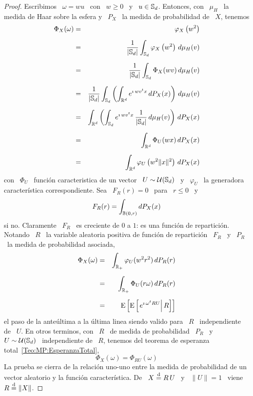 \begin{proof}
  Escribimos \  $\omega = w u$ \  con \ $w \ge  0$ \ y \  $u \in \mathbb{S}_d$.
  Entonces, con  \ $\mu_H$ \ la  medida de Haar sobre  la esfera y \  $P_X$ \ la
  medida de probabilidad de \ $X$, tenemos
  \begin{eqnarray*}
  \Phi_X(\omega) & = & \varphi_X\left( w^2 \right)\\[2mm]
  & = & \frac{1}{|\mathbb{S}_d|} \int_{\mathbb{S}_d} \varphi_X\left( w^2 \right) \, d\mu_H(v)\\[2mm]
  & = & \frac{1}{|\mathbb{S}_d|} \int_{\mathbb{S}_d} \Phi_X(w v) \, d\mu_H(v)\\[2mm]
  & = & \frac{1}{|\mathbb{S}_d|} \int_{\mathbb{S}_d} \left( \int_{\mathbb{R}^d} e^{\imath \,
  w v^t x} \, dP_X(x) \right) \, d\mu_H(v)\\[2mm]
  & = & \int_{\mathbb{R}^d} \left( \int_{\mathbb{S}_d} e^{\imath \, w v^t x} \,
  \frac{1}{|\mathbb{S}_d|} \, d\mu_H(v) \right) \, dP_X(x)\\[2mm]
  & = & \int_{\mathbb{R}^d} \Phi_U(w x) \, dP_X(x)\\[2mm]
  & = & \int_{\mathbb{R}^d} \varphi_U\left( w^2 \|x\|^2 \right) \, dP_X(x)
  \end{eqnarray*}
  con \ $\Phi_U$ \ funci\'on caracteristica  de un vector \ $U \sim \mathcal{U}(\mathbb{S}_d)$
  \ y  \ $\varphi_U$  \ la generadora  caracter\'istica correspondiente.   Sea \
  $F_R(r) = 0$ \ para \ $r \le 0$ \ y
  \[
  F_R(r) = \int_{\mathbb{B}(0,r)} dP_X(x)
  \]
  si no.  Claramente  \ $F_R$ \ es creciente  de $0$ a $1$: es  una funci\'on de
  repartici\'on. Notando \ $R$ \  la variable aleatoria positiva de funci\'on de
  repartici\'on \ $F_R$ \ y \ $P_R$ \ la medida de probabilidad asociada,
  \begin{eqnarray*}
  \Phi_X(\omega) & = & \int_{\mathbb{R}_+} \varphi_U( w^2 r^2) \, dP_R(r)\\[2mm]
  & = & \int_{\mathbb{R}_+} \Phi_U(r \omega) \, dP_R(r)\\[2mm]
  & = & \operatorname{E}\left[ \operatorname{E}\left[ \left. e^{\imath \, \omega^t R U} \right | R \right] \right]
  \end{eqnarray*}
  el paso  de la ante\'ultima  a la  \'ultima linea siendo  valido para \  $R$ \
  independiente  de  \ $U$.   En  otros  terminos, con  \  $R$  \  de medida  de
  probabilidad \  $P_R$ \  y \ $U  \sim \mathcal{U}(\mathbb{S}_d)$  \ independiente de  \ $R$,
  tenemos del teorema de esperanza total~\ref{Teo:MP:EsperanzaTotal},
  \[
  \Phi_X(\omega) = \Phi_{R U}(\omega)
  \]
  La prueba se  cierra de la relaci\'on uno-uno entre  la medida de probabilidad
  de un vector aleatorio y la funci\'on caracter\'istica. De \ $X \stackrel{\mathrm{d}}{=} R \, U$
  \ y \ $\| U \| = 1$ \ viene \ $R \stackrel{\mathrm{d}}{=} \| X \|$.
\end{proof}

